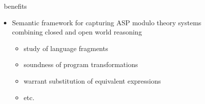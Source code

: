 \begin{frame}{\HTC\ benefits}
  \bigskip
  \begin{itemize}
  \item Semantic framework for capturing ASP modulo theory systems
    \\
    combining closed and open world reasoning
    \par\smallskip
    \begin{itemize}\normalsize
    \item study of language fragments
    \item soundness of program transformations
    \item warrant substitution of equivalent expressions
    \item etc.
    \end{itemize}
  \end{itemize}
\end{frame}
%
